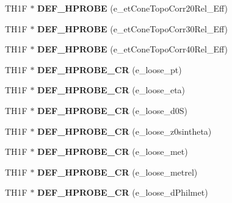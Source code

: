 \begin{DoxyCompactItemize}
\item 
\hypertarget{classHistos__Fake_a2ae8038f58cee1e60477319106adf7cd}{
TH1F $\ast$ {\bfseries DEF\_\-HPROBE} (e\_\-etConeTopoCorr20Rel\_\-Eff)}
\label{classHistos__Fake_a2ae8038f58cee1e60477319106adf7cd}

\item 
\hypertarget{classHistos__Fake_a0500c81905a480e5e42903add6938130}{
TH1F $\ast$ {\bfseries DEF\_\-HPROBE} (e\_\-etConeTopoCorr30Rel\_\-Eff)}
\label{classHistos__Fake_a0500c81905a480e5e42903add6938130}

\item 
\hypertarget{classHistos__Fake_a9af4d2a05a888d89d3ee04398b9e67ba}{
TH1F $\ast$ {\bfseries DEF\_\-HPROBE} (e\_\-etConeTopoCorr40Rel\_\-Eff)}
\label{classHistos__Fake_a9af4d2a05a888d89d3ee04398b9e67ba}

\item 
\hypertarget{classHistos__Fake_ac4d170ed777fd30db1fcbc010a0ecf79}{
TH1F $\ast$ {\bfseries DEF\_\-HPROBE\_\-CR} (e\_\-loose\_\-pt)}
\label{classHistos__Fake_ac4d170ed777fd30db1fcbc010a0ecf79}

\item 
\hypertarget{classHistos__Fake_a20e16938149f35429f206b62a08d5d38}{
TH1F $\ast$ {\bfseries DEF\_\-HPROBE\_\-CR} (e\_\-loose\_\-eta)}
\label{classHistos__Fake_a20e16938149f35429f206b62a08d5d38}

\item 
\hypertarget{classHistos__Fake_affdc834288fa083c5176019b155bc451}{
TH1F $\ast$ {\bfseries DEF\_\-HPROBE\_\-CR} (e\_\-loose\_\-d0S)}
\label{classHistos__Fake_affdc834288fa083c5176019b155bc451}

\item 
\hypertarget{classHistos__Fake_a5b7106c08ed64a51e5aa679f050da805}{
TH1F $\ast$ {\bfseries DEF\_\-HPROBE\_\-CR} (e\_\-loose\_\-z0sintheta)}
\label{classHistos__Fake_a5b7106c08ed64a51e5aa679f050da805}

\item 
\hypertarget{classHistos__Fake_ad8b3e332cfc182f81142d28c8b9e035c}{
TH1F $\ast$ {\bfseries DEF\_\-HPROBE\_\-CR} (e\_\-loose\_\-met)}
\label{classHistos__Fake_ad8b3e332cfc182f81142d28c8b9e035c}

\item 
\hypertarget{classHistos__Fake_abebb6802b5f0d7750df400228c2e7124}{
TH1F $\ast$ {\bfseries DEF\_\-HPROBE\_\-CR} (e\_\-loose\_\-metrel)}
\label{classHistos__Fake_abebb6802b5f0d7750df400228c2e7124}

\item 
\hypertarget{classHistos__Fake_aa83d03f841d6a70143abaeec0d082452}{
TH1F $\ast$ {\bfseries DEF\_\-HPROBE\_\-CR} (e\_\-loose\_\-dPhilmet)}
\label{classHistos__Fake_aa83d03f841d6a70143abaeec0d082452}


\end{DoxyCompactItemize}

